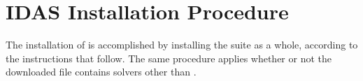 \chapter{IDAS Installation Procedure}\label{s:install}

The installation of {\idas} is accomplished by installing the
{\sundials} suite as a whole, according to the instructions that
follow.   The same procedure applies whether or not the downloaded
file contains solvers other than {\idas}.

